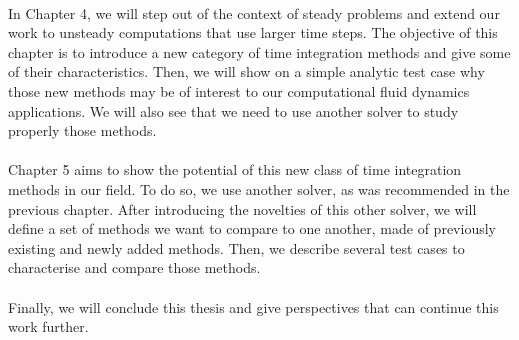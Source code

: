     \paragraph{}
    In Chapter 4, we will step out of the context of steady problems and extend our work to unsteady computations that use larger time steps.
    The objective of this chapter is to introduce a new category of time integration methods and give some of their characteristics.
    Then, we will show on a simple analytic test case why those new methods may be of interest to our computational fluid dynamics applications.
    We will also see that we need to use another solver to study properly those methods.

    \pagebreak
    \paragraph{}
    Chapter 5 aims to show the potential of this new class of time integration methods in our field.
    To do so, we use another solver, as was recommended in the previous chapter.
    After introducing the novelties of this other solver, we will define a set of methods we want to compare to one another, made of previously existing and newly added methods.
    Then, we describe several test cases to characterise and compare those methods.

    \paragraph{}
    Finally, we will conclude this thesis and give perspectives that can continue this work further.
